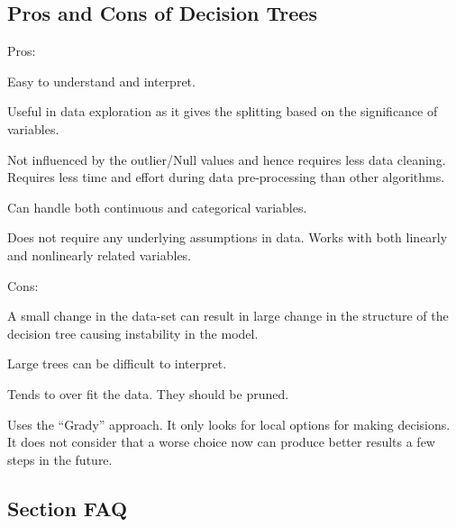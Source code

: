 	\subsection{Pros and Cons of Decision Trees}
Pros:
	\begin{bulletedlist}
		\item Easy to understand and interpret.
		\item Useful in data exploration as it gives the splitting based on the significance of variables.
		\item Not influenced by the outlier/Null values and hence requires less data cleaning. Requires less time and effort during data pre-processing than other algorithms.
		\item Can handle both continuous and categorical variables.
		\item Does not require any underlying assumptions in data.  Works with both linearly and nonlinearly related variables.
	\end{bulletedlist}

Cons:
	\begin{bulletedlist}
		\item A small change in the data-set can result in large change in the structure of the decision tree causing instability in the model.
		\item Large trees can be difficult to interpret.
		\item Tends to over fit the data.  They should be pruned.
		\item Uses the ``Grady'' approach.  It only looks for local options for making decisions.  It does not consider that a worse choice now can produce better results a few steps in the future.
	\end{bulletedlist}

	\subsection{Section FAQ}
    \begin{qanda}

    \end{qanda}

    \begin{qanda}

    \end{qanda}


